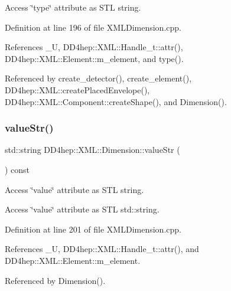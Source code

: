 Access \char`\"{}type\char`\"{} attribute as S\+TL string. 



Definition at line 196 of file X\+M\+L\+Dimension.\+cpp.



References \+\_\+U, D\+D4hep\+::\+X\+M\+L\+::\+Handle\+\_\+t\+::attr(), D\+D4hep\+::\+X\+M\+L\+::\+Element\+::m\+\_\+element, and type().



Referenced by create\+\_\+detector(), create\+\_\+element(), D\+D4hep\+::\+X\+M\+L\+::create\+Placed\+Envelope(), D\+D4hep\+::\+X\+M\+L\+::\+Component\+::create\+Shape(), and Dimension().

\hypertarget{struct_d_d4hep_1_1_x_m_l_1_1_dimension_a0294b54367d4bb0ce8d72a6496e5ae33}{}\label{struct_d_d4hep_1_1_x_m_l_1_1_dimension_a0294b54367d4bb0ce8d72a6496e5ae33} 
\subsubsection{\texorpdfstring{value\+Str()}{valueStr()}}
{\footnotesize\ttfamily std\+::string D\+D4hep\+::\+X\+M\+L\+::\+Dimension\+::value\+Str (\begin{DoxyParamCaption}{ }\end{DoxyParamCaption}) const}



Access \char`\"{}value\char`\"{} attribute as S\+TL string. 

Access \char`\"{}value\char`\"{} attribute as S\+TL std\+::string. 

Definition at line 201 of file X\+M\+L\+Dimension.\+cpp.



References \+\_\+U, D\+D4hep\+::\+X\+M\+L\+::\+Handle\+\_\+t\+::attr(), and D\+D4hep\+::\+X\+M\+L\+::\+Element\+::m\+\_\+element.



Referenced by Dimension().

\hypertarget{struct_d_d4hep_1_1_x_m_l_1_1_dimension_ab62917a655c72e27cae07984025203c3}{}\label{struct_d_d4hep_1_1_x_m_l_1_1_dimension_ab62917a655c72e27cae07984025203c3} 
